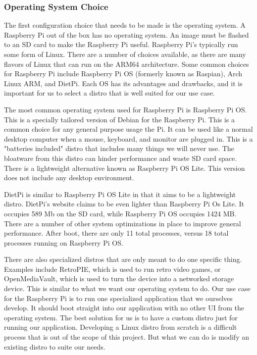 \subsubsection{Operating System Choice}

The first configuration choice that needs to be made is the operating system. A Raspberry
Pi out of the box has no operating system. An image must be flashed to an SD card to make
the Raspberry Pi useful. Raspberry Pi's typically run some form of Linux. There are a
number of choices available, as there are many flavors of Linux that can run on the ARM64
architecture. Some common choices for Raspberry Pi include Raspberry Pi OS (formerly known
as Raspian), Arch Linux ARM, and DietPi. Each OS has its advantages and drawbacks, and it
is important for us to select a distro that is well suited for our use case.

The most common operating system used for Raspberry Pi is Raspberry Pi OS. This is a
specially tailored version of Debian for the Raspberry Pi. This is a common choice for any
general purpose usage the Pi. It can be used like a normal desktop computer when a mouse,
keyboard, and monitor are plugged in. This is a "batteries included" distro that includes
many things we will never use. The bloatware from this distro can hinder performance and
waste SD card space. There is a lightweight alternative known as Raspberry Pi OS Lite.
This version does not include any desktop environment.

DietPi is similar to Raspberry Pi OS Lite in that it aims to be a lightweight distro.
DietPi's website claims to be even lighter than Raspberry Pi Os Lite. It occupies 589 Mb
on the SD card, while Raspberry Pi OS occupies 1424 MB. There are a number of other system
optimizations in place to improve general performance. After boot, there are only 11 total
processes, versus 18 total processes running on Raspberry Pi OS.

There are also specialized distros that are only meant to do one specific thing. Examples
include RetroPIE, which is used to run retro video games, or OpenMediaVault, which is used
to turn the device into a networked storage device. This is similar to what we want our
operating system to do. Our use case for the Raspberry Pi is to run one specialized
application that we ourselves develop. It should boot straight into our application with
no other UI from the operating system. The best solution for us is to have a custom distro
just for running our application. Developing a Linux distro from scratch is a difficult
process that is out of the scope of this project. But what we can do is modify an existing
distro to suite our needs.

